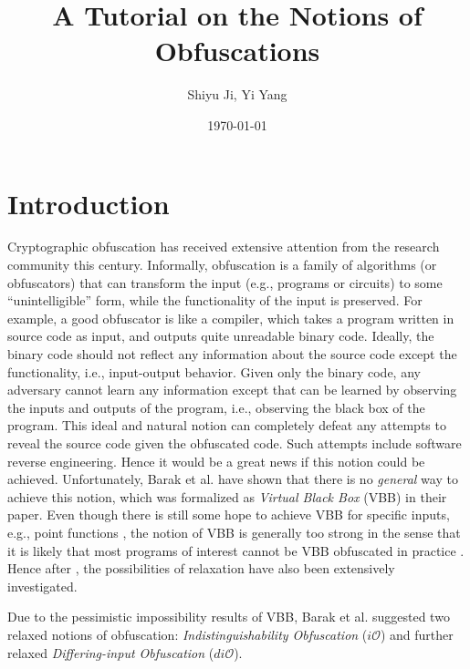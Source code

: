 \documentclass[12pt]{article}
\newcommand{\heading}[5]{
   \renewcommand{\thepage}{#1-\arabic{page}}
   \noindent
   \begin{center}
   \framebox[\textwidth]{
     \begin{minipage}{0.9\textwidth} \onehalfspacing
       {\bf CS 290G -- Introduction to Modern Cryptography} \hfill #2

       {\centering \Large #5
       
       }\medskip

       {\it #3 \hfill #4}
     \end{minipage}
   }
   \end{center}
}
\newcommand{\handout}[3]{\heading{#1}{#2}{Instructor:
Stefano Tessaro}{Student: Shiyu Ji, Yi Yang}{A Tutorial on the Notions of Obfuscations}}
\newcommand{\io}{$i\mathcal{O}$}
\newcommand{\dio}{$di\mathcal{O}$}
\theoremstyle{definition}
\begin{document}
\title{A Tutorial on the Notions of Obfuscations}
\author{Shiyu Ji, Yi Yang}
\date{\today}
\maketitle

\section{Introduction}
Cryptographic obfuscation has received extensive attention from the research community this century. Informally, obfuscation is a family of algorithms (or obfuscators) that can transform the input (e.g., programs or circuits) to some ``unintelligible'' form, while the functionality of the input is preserved. For example, a good obfuscator is like a compiler, which takes a program written in source code as input, and outputs quite unreadable binary code. Ideally, the binary code should not reflect any information about the source code except the functionality, i.e., input-output behavior. Given only the binary code, any adversary cannot learn any information except that can be learned by observing the inputs and outputs of the program, i.e., observing the black box of the program. This ideal and natural notion can completely defeat any attempts to reveal the source code given the obfuscated code. Such attempts include software reverse engineering. Hence it would be a great news if this notion could be achieved. Unfortunately, Barak et al. \cite{barak2001possibility} have shown that there is no \emph{general} way to achieve this notion, which was formalized as \emph{Virtual Black Box} (VBB) in their paper. Even though there is still some hope to achieve VBB for specific inputs, e.g., point functions \cite{canetti1997towards, canetti1998perfectly, wee2005obfuscating}, the notion of VBB is generally too strong in the sense that it is likely that most programs of interest cannot be VBB obfuscated in practice \cite{goldwasser2005impossibility}. Hence after \cite{barak2001possibility}, the possibilities of relaxation have also been extensively investigated.

Due to the pessimistic impossibility results of VBB, Barak et al. \cite{barak2001possibility} suggested two relaxed notions of obfuscation: \emph{Indistinguishability Obfuscation} (\io) and further relaxed \emph{Differing-input Obfuscation} (\dio).


	
\end{document}
